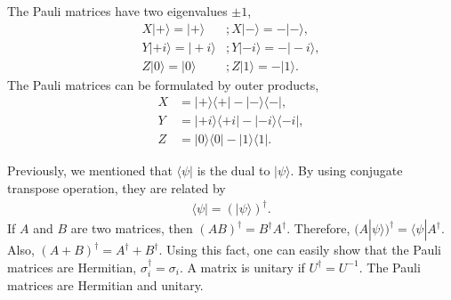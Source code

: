 \documentclass{beamer}
\begin{document}
\begin{frame}
\justify
The Pauli matrices have two eigenvalues $\pm 1$,
\begin{align}
X |+\rangle = |+\rangle &; X |-\rangle = - |-\rangle, \\
Y |+i\rangle = |+i\rangle &; Y |-i\rangle = - |-i\rangle, \\
Z |0\rangle = |0\rangle &; Z |1\rangle = - |1\rangle.
\end{align}
\vfill
The Pauli matrices can be formulated by outer products,
\begin{align}
X & = |+\rangle \langle+| - |-\rangle \langle-|, \\
Y & = |+i\rangle \langle+i| - |-i\rangle \langle-i|, \\
Z & = |0\rangle \langle0| - |1\rangle \langle1|.
\end{align}
\end{frame}

\begin{frame}
\justify
Previously, we mentioned that $\langle\psi|$ is the dual to $|\psi\rangle$. By using conjugate transpose operation, they are related by
\begin{align}
\langle\psi| = (|\psi\rangle)^\dagger.
\end{align}
\vfill
If $A$ and $B$ are two matrices, then $(AB)^\dagger = B^\dagger A^\dagger$. Therefore, $(A|\psi\rangle)^\dagger = \langle\psi| A^\dagger$.
\vfill
Also, $(A+B)^\dagger = A^\dagger + B^\dagger$. Using this fact, one can easily show that the Pauli matrices are Hermitian, $\sigma_i^\dagger = \sigma_i$.
\vfill
A matrix is unitary if $U^\dagger = U^{-1}$. The Pauli matrices are Hermitian and unitary.
\end{frame}
\end{document}
